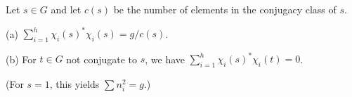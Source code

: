 Let $s \in G$ and let $c(s)$ be the number of elements in the conjugacy class of $s$.

(a) $\sum_{i=1}^{h} \chi_i(s)^* \chi_i(s) = g / c(s)$.

(b) For $t \in G$ not conjugate to $s$, we have $\sum_{i=1}^{h} \chi_i(s)^* \chi_i(t) = 0$.

(For $s = 1$, this yields $\sum n_i^2 = g$.)

